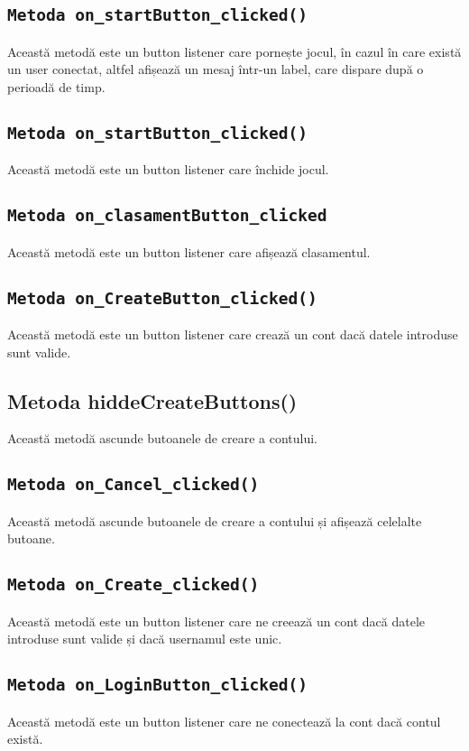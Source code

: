 \documentclass{article}
\begin{document}
\subsection{\texttt{Metoda on\_startButton\_clicked()}}
Această metodă este un button listener care pornește jocul, în cazul în care există un user conectat, altfel afișează un mesaj într-un label, care dispare după o perioadă de timp.

\subsection{\texttt{Metoda on\_startButton\_clicked()}}
Această metodă este un button listener care închide jocul.

\subsection{\texttt{Metoda on\_clasamentButton\_clicked}}
Această metodă este un button listener care afișează clasamentul.

\subsection{\texttt{Metoda on\_CreateButton\_clicked()}}
Această metodă este un button listener care crează un cont dacă datele introduse sunt valide.

\subsection{Metoda hiddeCreateButtons()}
Această metodă ascunde butoanele de creare a contului.

\subsection{\texttt{Metoda on\_Cancel\_clicked()}}
Această metodă ascunde butoanele de creare a contului și afișează celelalte butoane.

\subsection{\texttt{Metoda on\_Create\_clicked()}}
Această metodă este un button listener care ne creează  un cont dacă datele introduse sunt valide și dacă usernamul este unic.

\subsection{\texttt{Metoda on\_LoginButton\_clicked()}}
Această metodă este un button listener care ne conectează la cont dacă contul există.
\end{document}
